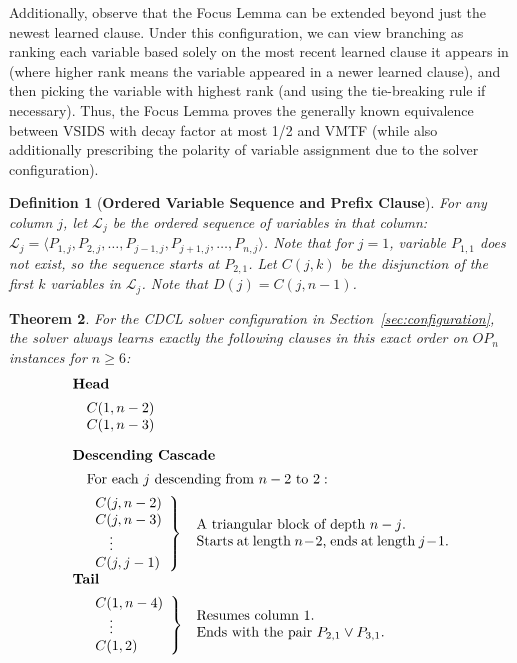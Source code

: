 \documentclass[10pt,a4paper]{article}
\newtheorem{theorem}{Theorem}
\newtheorem{definition}[theorem]{Definition}
\begin{document}
Additionally, observe that the Focus Lemma can be extended beyond just the newest learned clause. Under this configuration, we can view branching as ranking each variable based solely on the most recent learned clause it appears in (where higher rank means the variable appeared in a newer learned clause), and then picking the variable with highest rank (and using the tie-breaking rule if necessary). Thus, the Focus Lemma proves the generally known equivalence between VSIDS with decay factor at most 1/2 and VMTF (while also additionally prescribing the polarity of variable assignment due to the solver configuration).  

\begin{definition}[{\bf Ordered Variable Sequence and Prefix Clause}]
For any column $j$, let $\mathcal{L}_j$ be the ordered sequence of variables in that column: $\mathcal{L}_j = \langle P_{1,j}, P_{2,j}, \dots, P_{j-1,j}, P_{j+1,j}, \dots, P_{n, j} \rangle$. Note that for $j=1$, variable $P_{1,1}$ does not exist, so the sequence starts at $P_{2,1}$. Let $C(j, k)$ be the disjunction of the first $k$ variables in $\mathcal{L}_j$. Note that $D(j) = C(j, n - 1)$.
\end{definition}


\begin{theorem}
\label{theorem:clause_structure}
For the CDCL solver configuration in Section~\ref{sec:configuration}, the solver always learns exactly the following clauses in this exact order on $OP_n$ instances for $n \geq 6$:
$$
\begin{array}{rll}
\multicolumn{3}{l}{\textbf{Head}} \\[.5em]
& C(1, n-2)  \\
& C(1, n-3) \\[1em]

\multicolumn{3}{l}{\textbf{Descending Cascade}} \\[.5em]
& \multicolumn{2}{l}{\text{For each } j \text{ descending from } n-2 \text{ to } 2:} \\[0.5em]
& \left.
    \begin{array}{l}
    C(j, n-2) \\
    C(j, n-3) \\
    \quad \vdots \\
    C(j, j-1)
    \end{array}
  \right\} & \parbox{18em}{A triangular block of depth $n-j$. \\ Starts at length $n - 2$, ends at length $j-1$.} \\[1em]

\multicolumn{3}{l}{\textbf{Tail}} \\[.5em]
& \left.
    \begin{array}{l}
    C(1, n-4) \\
    \quad \vdots \\
    C(1, 2)
    \end{array}
  \right\} & \parbox{18em}{Resumes column 1. \\ Ends with the pair $P_{2,1} \vee P_{3,1}$.}
\end{array}
$$
\end{theorem}
\end{document}

